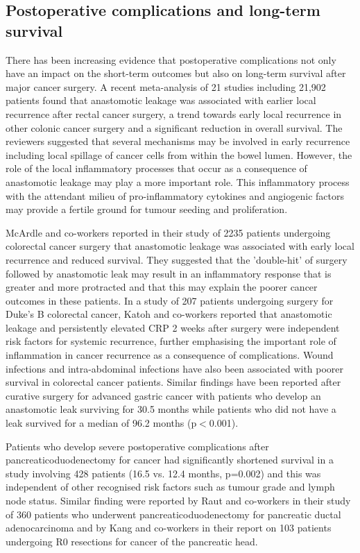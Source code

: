 \subsection{Postoperative complications and long-term survival}
There has been increasing evidence that postoperative complications not only have an impact on the short-term outcomes but also on long-term survival after major cancer surgery. A recent meta-analysis of 21 studies including 21,902 patients found that anastomotic leakage was associated with earlier local recurrence after rectal cancer surgery, a trend towards early local recurrence in other colonic cancer surgery and a significant reduction in overall survival.\parencite{mirnezami_increased_2011} The reviewers suggested that several mechanisms may be involved in early recurrence including local spillage of cancer cells from within the bowel lumen. However, the role of the local inflammatory processes that occur as a consequence of anastomotic leakage may play a more important role. This inflammatory process with the attendant milieu of pro-inflammatory cytokines and angiogenic factors may provide a fertile ground for tumour seeding and proliferation.

McArdle and co-workers reported in their study of 2235 patients undergoing colorectal cancer surgery that anastomotic leakage was associated with early local recurrence and reduced survival. They suggested that the 'double-hit' of surgery followed by anastomotic leak may result in an inflammatory response that is greater and more protracted and that this may explain the poorer cancer outcomes in these patients.\parencite{mcardle_impact_2005} In a study of 207 patients undergoing surgery for Duke's B colorectal cancer, Katoh and co-workers reported that anastomotic leakage and persistently elevated CRP 2 weeks after surgery were independent risk factors for systemic recurrence, further emphasising the important role of inflammation in cancer recurrence as a consequence of complications.\parencite{katoh_anastomotic_2011} Wound infections and intra-abdominal infections have also been associated with poorer survival in colorectal cancer patients.\parencite{nespoli_impact_2006} Similar findings have been reported after curative surgery for advanced gastric cancer with patients who develop an anastomotic leak surviving for 30.5 months while patients who did not have a leak survived for a median of 96.2 months (p$<$0.001). \parencite{yoo_negative_2011} 

Patients who develop severe postoperative complications after pancreaticoduodenectomy for cancer had significantly shortened survival in a study involving 428 patients (16.5 vs. 12.4 months, p=0.002) and this was independent of other recognised risk factors such as tumour grade and lymph node status. \parencite{kamphues_postoperative_2011} Similar finding were reported by Raut and co-workers in their study of 360 patients who underwent pancreaticoduodenectomy for pancreatic ductal adenocarcinoma \parencite{raut_impact_2007} and by Kang and co-workers in their report on 103 patients undergoing R0 resections for cancer of the pancreatic head. \parencite{kang_detrimental_2009}

